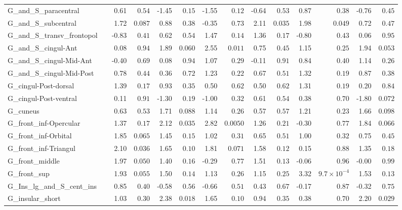 {\begin{longtable}{llrrrrrrrrrrrr}
G\_and\_S\_paracentral &  & 0.61 & $0.54$ & -1.45 & $0.15$ & -1.55 & $0.12$ & -0.64 & $0.53$ & 0.87 & $0.38$ & -0.76 & $0.45$ \\
G\_and\_S\_subcentral &  & 1.72 & $0.087$ & 0.88 & $0.38$ & -0.35 & $0.73$ & 2.11 & $0.035$ & 1.98 & $0.049$ & 0.72 & $0.47$ \\
G\_and\_S\_transv\_frontopol &  & -0.83 & $0.41$ & 0.62 & $0.54$ & 1.47 & $0.14$ & 1.36 & $0.17$ & -0.80 & $0.43$ & 0.06 & $0.95$ \\
G\_and\_S\_cingul-Ant &  & 0.08 & $0.94$ & 1.89 & $0.060$ & 2.55 & $0.011$ & 0.75 & $0.45$ & 1.15 & $0.25$ & 1.94 & $0.053$ \\
G\_and\_S\_cingul-Mid-Ant &  & -0.40 & $0.69$ & 0.08 & $0.94$ & 1.07 & $0.29$ & -0.11 & $0.91$ & 0.84 & $0.40$ & 1.14 & $0.26$ \\
G\_and\_S\_cingul-Mid-Post &  & 0.78 & $0.44$ & 0.36 & $0.72$ & 1.23 & $0.22$ & 0.67 & $0.51$ & 1.32 & $0.19$ & 0.87 & $0.38$ \\
G\_cingul-Post-dorsal &  & 1.39 & $0.17$ & 0.93 & $0.35$ & 0.50 & $0.62$ & 0.50 & $0.62$ & 1.31 & $0.19$ & 0.20 & $0.84$ \\
G\_cingul-Post-ventral &  & 0.11 & $0.91$ & -1.30 & $0.19$ & -1.00 & $0.32$ & 0.61 & $0.54$ & 0.38 & $0.70$ & -1.80 & $0.072$ \\
G\_cuneus &  & 0.63 & $0.53$ & 1.71 & $0.088$ & 1.14 & $0.26$ & 0.57 & $0.57$ & 1.21 & $0.23$ & 1.66 & $0.098$ \\
G\_front\_inf-Opercular &  & 1.37 & $0.17$ & 2.12 & $0.035$ & 2.82 & $0.0050$ & 1.26 & $0.21$ & -0.30 & $0.77$ & 1.84 & $0.066$ \\
G\_front\_inf-Orbital &  & 1.85 & $0.065$ & 1.45 & $0.15$ & 1.02 & $0.31$ & 0.65 & $0.51$ & 1.00 & $0.32$ & 0.75 & $0.45$ \\
G\_front\_inf-Triangul &  & 2.10 & $0.036$ & 1.65 & $0.10$ & 1.81 & $0.071$ & 1.58 & $0.12$ & 0.15 & $0.88$ & 1.35 & $0.18$ \\
G\_front\_middle &  & 1.97 & $0.050$ & 1.40 & $0.16$ & -0.29 & $0.77$ & 1.51 & $0.13$ & -0.06 & $0.96$ & -0.00 & $0.99$ \\
G\_front\_sup &  & 1.93 & $0.055$ & 1.50 & $0.14$ & 1.13 & $0.26$ & 1.15 & $0.25$ & 3.32 & $9.7{\times}10^{-4}$ & 1.53 & $0.13$ \\
G\_Ins\_lg\_and\_S\_cent\_ins &  & 0.85 & $0.40$ & -0.58 & $0.56$ & -0.66 & $0.51$ & 0.43 & $0.67$ & -0.17 & $0.87$ & -0.32 & $0.75$ \\
G\_insular\_short &  & 1.03 & $0.30$ & 2.38 & $0.018$ & 1.65 & $0.10$ & 0.94 & $0.35$ & 0.38 & $0.70$ & 2.20 & $0.029$ \\

\end{longtable}}
